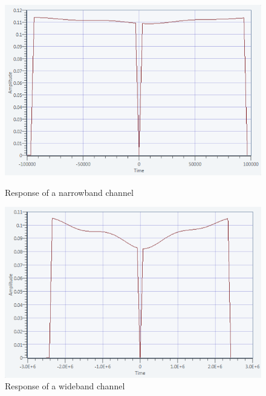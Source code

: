 \documentclass[frenchb, oneside, headings=normal]{scrartcl}
\begin{document}
\begin{figure}[!ht]
    \begin{minipage}[b]{0.48\linewidth}
        \centering \includegraphics[scale=0.45]{img/channel_response_narrow.png}
     \caption{Response of a narrowband channel}
     \label{fig2}
    \end{minipage}\hfill
    \begin{minipage}[b]{0.48\linewidth}
         \centering \includegraphics[scale=0.45]{img/channel_response_wideband.png}
 \caption{Response of a wideband channel}\label{fig3}
    \end{minipage}
\end{figure}

\end{document}
